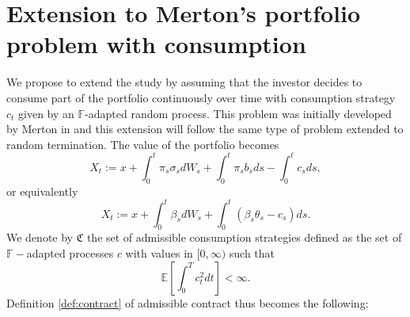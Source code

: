 \documentclass[11pt,a4paper]{article}
\theoremstyle{thmstyleone}%
\theoremstyle{thmstyletwo}%
\theoremstyle{thmstylethree}%
\begin{document}
\section{Extension to Merton's portfolio problem with consumption}\label{consumption extension}


 We propose to extend the study by assuming that the investor decides to consume part of the portfolio continuously over time with consumption strategy $c_t$ given by an $\mathbb F$-adapted random process. This problem was initially developed by Merton in \cite{merton1975optimum} and this extension will follow the same type of problem extended to random termination.  The value of the portfolio becomes
\[
    X_t := x + \int_0^t \pi_s \sigma_s dW_s + \int_0^t \pi_s b_s ds - \int_0^t c_s ds, \]
    or equivalently
\[ X_t:= x + \int_0^t \beta_s dW_s + \int_0^t (\beta_s \theta_s-c_s) ds.
\]
We denote by $\mathfrak C$ the set of admissible consumption strategies defined as the set of $\mathbb F-$adapted processes $c$ with values in $[0,\infty)$ such that \[\mathbb E[\int_0^T c_t^2dt]<\infty.\]
Definition \ref{def:contract} of admissible contract thus becomes the following:
\end{document}
